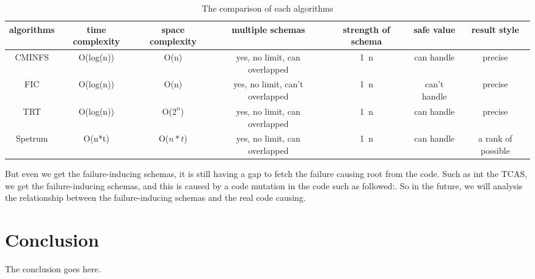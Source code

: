 \documentclass[10pt,journal,cspaper,compsoc]{IEEEtran}
\begin{document}
\begin{table}\renewcommand{\arraystretch}{1.3}
  \caption{The comparison of each algorithms} \centering
  \label{comparison-metrics}
  \begin{tabular}{c|c|c|c|c|c|c}\hline
  \hline
  \bfseries algorithms & \bfseries time complexity  & \bfseries space complexity & \bfseries multiple schemas & \bfseries strength of schema & \bfseries safe value & \bfseries result style \\
  \hline
    CMINFS & O(log(n)) & O(n) & yes, no limit, can overlapped & 1~n & can handle & precise \\
  \hline
    FIC & O(log(n)) & O(n) & yes, no limit, can't overlapped & 1~n & can't handle & precise \\
    TRT & O(log(n)) & O($2^n$) & yes, no limit, can overlapped & 1~n & can handle &precise \\
    Spetrum & O(n*t) & O($n*t$) & yes, no limit, can overlapped & 1~n & can handle & a rank of possible \\
  \hline
  \end{tabular}

\end{table}

But even we get the failure-inducing schemas, it is still having a gap to fetch the failure causing root from the code. Such as int the TCAS, we get the failure-inducing schemas, and this is caused by a code mutation in the code such as followed:.  So in the future, we will analysis the relationship between the failure-inducing schemas and the real code causing.


\section{Conclusion}
The conclusion goes here.






%
\end{document}
